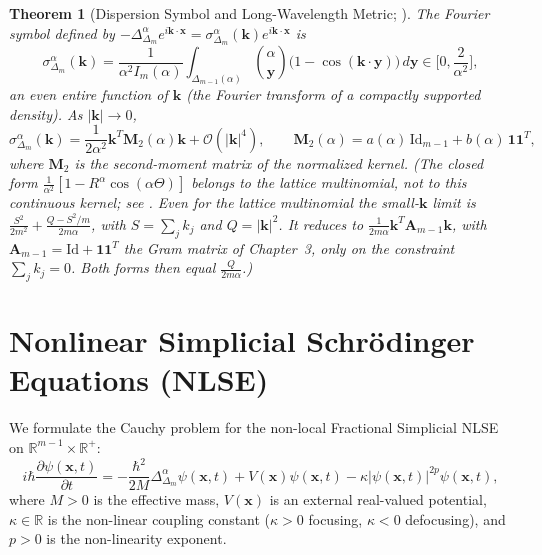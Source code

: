 \documentclass[11pt,a4paper]{article}
\theoremstyle{plain}
\newtheorem{theorem}{Theorem}[section]
\theoremstyle{definition}
\theoremstyle{remark}
\numberwithin{equation}{section}
\begin{document}
\begin{theorem}[Dispersion Symbol and Long-Wavelength Metric; {\cite[Thm.~7.2]{silvafilho2026simplex}}]
\label{thm:dispersion}
The Fourier symbol defined by $-\Delta_{\Delta_m}^\alpha e^{i\mathbf{k}\cdot\mathbf{x}} = \sigma_{\Delta_m}^\alpha(\mathbf{k}) e^{i\mathbf{k}\cdot\mathbf{x}}$ is
\begin{equation}
\sigma_{\Delta_m}^\alpha(\mathbf{k}) = \frac{1}{\alpha^2 I_m(\alpha)}\int_{\Delta_{m-1}(\alpha)} \binom{\alpha}{\mathbf{y}}\big(1 - \cos(\mathbf{k}\cdot\mathbf{y})\big)\,d\mathbf{y} \in \Big[0, \frac{2}{\alpha^2}\Big],
\end{equation}
an even entire function of $\mathbf{k}$ (the Fourier transform of a compactly supported density). As $|\mathbf{k}| \to 0$,
\begin{equation}
\sigma_{\Delta_m}^\alpha(\mathbf{k}) = \frac{1}{2\alpha^2}\mathbf{k}^T \mathbf{M}_2(\alpha)\mathbf{k} + \mathcal{O}(|\mathbf{k}|^4), \qquad \mathbf{M}_2(\alpha) = a(\alpha)\,\mathrm{Id}_{m-1} + b(\alpha)\,\mathbf{1}\mathbf{1}^T,
\end{equation}
where $\mathbf{M}_2$ is the second-moment matrix of the normalized kernel. (The closed form $\frac{1}{\alpha^2}[1 - R^\alpha\cos(\alpha\Theta)]$ belongs to the lattice multinomial, not to this continuous kernel; see \cite{silvafilho2026simplex}. Even for the lattice multinomial the small-$\mathbf{k}$ limit is $\frac{S^2}{2m^2} + \frac{Q - S^2/m}{2m\alpha}$, with $S = \sum_j k_j$ and $Q = |\mathbf{k}|^2$. It reduces to $\frac{1}{2m\alpha}\mathbf{k}^T\mathbf{A}_{m-1}\mathbf{k}$, with $\mathbf{A}_{m-1} = \mathrm{Id} +\mathbf{1}\mathbf{1}^T$ the Gram matrix of Chapter~3, only on the constraint $\sum_j k_j = 0$. Both forms then equal $\frac{Q}{2m\alpha}$.)
\end{theorem}

\section{Nonlinear Simplicial Schr\"odinger Equations (NLSE)}

We formulate the Cauchy problem for the non-local Fractional Simplicial NLSE on $\mathbb{R}^{m-1} \times \mathbb{R}^+$:
\begin{equation}
\label{eq:nlse_main}
i \hbar \frac{\partial \psi(\mathbf{x}, t)}{\partial t} = -\frac{\hbar^2}{2M}\Delta_{\Delta_m}^\alpha \psi(\mathbf{x}, t) + V(\mathbf{x})\psi(\mathbf{x}, t) - \kappa |\psi(\mathbf{x}, t)|^{2p}\psi(\mathbf{x}, t),
\end{equation}
where $M > 0$ is the effective mass, $V(\mathbf{x})$ is an external real-valued potential, $\kappa \in \mathbb{R}$ is the non-linear coupling constant ($\kappa > 0$ focusing, $\kappa < 0$ defocusing), and $p > 0$ is the non-linearity exponent.
\end{document}
